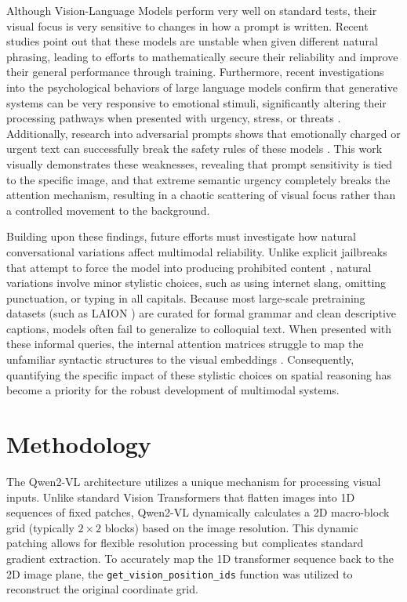 \documentclass[11pt, letterpaper]{article}
\begin{document}
Although Vision-Language Models perform very well on standard tests, their visual focus is very sensitive to changes in how a prompt is written. Recent studies point out that these models are unstable when given different natural phrasing, leading to efforts to mathematically secure their reliability \citep{yang2026semanticrobustnesscertificationvisionlanguage} and improve their general performance through training. Furthermore, recent investigations into the psychological behaviors of large language models confirm that generative systems can be very responsive to emotional stimuli, significantly altering their processing pathways when presented with urgency, stress, or threats \cite{li2023largelanguagemodelsunderstand, li2024goodbadwhyunveiling}. Additionally, research into adversarial prompts shows that emotionally charged or urgent text can successfully break the safety rules of these models \citep{zhao2023jailbreaking}. This work visually demonstrates these weaknesses, revealing that prompt sensitivity is tied to the specific image, and that extreme semantic urgency completely breaks the attention mechanism, resulting in a chaotic scattering of visual focus rather than a controlled movement to the background.

Building upon these findings, future efforts must investigate how natural conversational variations affect multimodal reliability. Unlike explicit jailbreaks that attempt to force the model into producing prohibited content \citep{zhao2023jailbreaking}, natural variations involve minor stylistic choices, such as using internet slang, omitting punctuation, or typing in all capitals. Because most large-scale pretraining datasets (such as LAION \citep{schuhmann2022laion5b}) are curated for formal grammar and clean descriptive captions, models often fail to generalize to colloquial text. When presented with these informal queries, the internal attention matrices struggle to map the unfamiliar syntactic structures to the visual embeddings \cite{yang2026semanticrobustnesscertificationvisionlanguage, yuksekgonul2023when}. Consequently, quantifying the specific impact of these stylistic choices on spatial reasoning has become a priority for the robust development of multimodal systems.

\section{Methodology}
\label{sec:methodology}

The Qwen2-VL architecture utilizes a unique mechanism for processing visual inputs. Unlike standard Vision Transformers that flatten images into 1D sequences of fixed patches, Qwen2-VL dynamically calculates a 2D macro-block grid (typically $2 \times 2$ blocks) based on the image resolution. This dynamic patching allows for flexible resolution processing but complicates standard gradient extraction. To accurately map the 1D transformer sequence back to the 2D image plane, the \texttt{get\_vision\_position\_ids} function was utilized to reconstruct the original coordinate grid.
\end{document}
